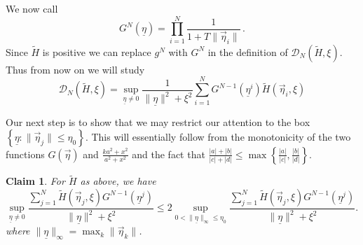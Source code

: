 \documentclass{article}
\newcommand\calD{{\mathcal D}}
\newcommand \ul[1]{\underline{#1}}
\renewcommand\v[1]{\vec{#1}}
\newcommand\set[1]{\left\{ #1 \right\}}
\newtheorem{myclaim}{Claim}
\begin{document}
We now call
\[
G^N(\ul\eta)=\prod_{i=1}^N\frac 1{1+T \|\v\eta_i\|}\, .
\]
Since $\widetilde H$ is positive we can replace $g^N$ with $G^N$ in the definition of $\calD_N(\widetilde H,\xi)$. Thus
from now on we will study
\[
\calD_N(\widetilde H,\xi)=\sup_{\ul \eta\not=0}\frac{1}{\|\ul \eta\|^2+\xi^2}
\sum_{i=1}^N G^{N-1}(\ul \eta^i)\widetilde H(\v\eta_i,\xi)
\]

Our next step is to show that we may restrict our attention to the box $\set{\ul \eta: \|\v\eta_j\|\leq \eta_0}.$ This
will essentially follow from the monotonicity of the two functions $G(\v\eta)$ and $\frac{ka^2 + x^2}{a^2 + x^2}$ and
the fact that $\frac{|a| + |b|}{|c| + |d|} \leq \max\set{\frac{|a|}{|c|}, \frac{|b|}{|d|}}.$

\begin{myclaim}
For $\widetilde H$ as above, we have
\[
\sup_{\ul \eta \ne 0} \frac{\sum_{j = 1}^N \widetilde H(\v\eta_j, \xi) G^{N - 
1}(\ul \eta^j)}{\|\ul \eta\|^2 + \xi^2} \leq 2 \sup_{0<\|\ul\eta\|_\infty \leq \eta_0} \frac{\sum_{j = 1}^N 
\widetilde H(\v\eta_j, \xi) G^{N - 1}(\ul \eta^j)}{\|\ul \eta\|^2 + \xi^2}.
\]
where $\|\ul\eta\|_\infty=\max_{k}\|\v\eta_k\|$.
\end{myclaim}
\end{document}

